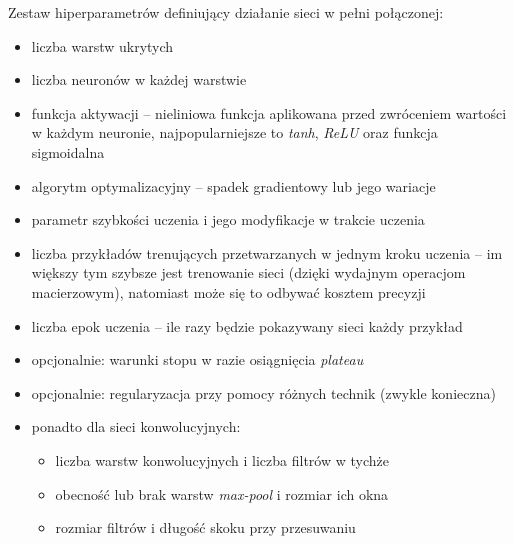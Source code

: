 Zestaw hiperparametrów definiujący działanie sieci w pełni połączonej: 
\begin{itemize}
	\item liczba warstw ukrytych 
	\item liczba neuronów w każdej warstwie
	\item funkcja aktywacji -- nieliniowa funkcja aplikowana przed zwróceniem wartości w każdym neuronie, najpopularniejsze to \textit{tanh}, \textit{ReLU} oraz funkcja sigmoidalna
	\item algorytm optymalizacyjny -- spadek gradientowy lub jego wariacje
	\item parametr szybkości uczenia i jego modyfikacje w trakcie uczenia
	\item liczba przykładów trenujących przetwarzanych w jednym kroku uczenia  -- im większy tym szybsze jest trenowanie sieci (dzięki wydajnym operacjom macierzowym), natomiast może się to odbywać kosztem precyzji
	\item liczba epok uczenia -- ile razy będzie pokazywany sieci każdy przykład
	\item opcjonalnie: warunki stopu  w razie osiągnięcia \textit{plateau}
	\item opcjonalnie: regularyzacja przy pomocy różnych technik (zwykle konieczna)
	\item ponadto dla sieci konwolucyjnych: 
	\begin{itemize}
		\item liczba warstw konwolucyjnych i liczba filtrów w tychże
		\item obecność lub brak warstw \textit{max-pool} i rozmiar ich okna
		\item rozmiar filtrów i długość skoku przy przesuwaniu
	\end{itemize}
\end{itemize}

